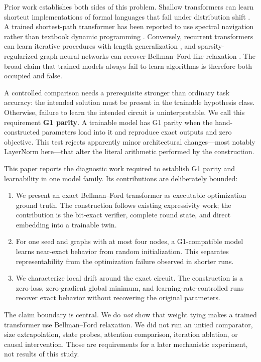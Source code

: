 \documentclass[10pt,twocolumn]{article}
\newcommand{\gparity}{\textsc{G1}}
\begin{document}
Prior work establishes both sides of this problem. Shallow transformers can
learn shortcut implementations of formal languages that fail under
distribution shift \citep{liu2022shortcuts}. A trained shortest-path
transformer has been reported to use spectral navigation rather than textbook
dynamic programming \citep{cohen2025spectral}. Conversely, recurrent
transformers can learn iterative procedures with length generalization
\citep{fan2024looped}, and sparsity-regularized graph neural networks can
recover Bellman--Ford-like relaxation \citep{nerem2026gnn}. The broad claim
that trained models always fail to learn algorithms is therefore both
occupied and false.

A controlled comparison needs a prerequisite stronger than ordinary task
accuracy: the intended solution must be present in the trainable hypothesis
class. Otherwise, failure to learn the intended circuit is uninterpretable.
We call this requirement \textbf{\gparity{} parity}. A trainable model has
\gparity{} parity when the hand-constructed parameters load into it and
reproduce exact outputs and zero objective. This test rejects apparently minor
architectural changes---most notably LayerNorm here---that alter the literal
arithmetic performed by the construction.

This paper reports the diagnostic work required to establish \gparity{} parity
and learnability in one model family. Its contributions are deliberately
bounded:

\begin{enumerate}
  \item We present an exact Bellman--Ford transformer as executable
  optimization ground truth. The construction follows existing expressivity
  work; the contribution is the bit-exact verifier, complete round state, and
  direct embedding into a trainable twin.
  \item For one seed and graphs with at most four nodes, a \gparity-compatible
  model learns near-exact behavior from random initialization. This separates
  representability from the optimization failure observed in shorter runs.
  \item We characterize local drift around the exact circuit. The construction
  is a zero-loss, zero-gradient global minimum, and learning-rate-controlled
  runs recover exact behavior without recovering the original parameters.
\end{enumerate}

The claim boundary is central. We do \emph{not} show that weight tying makes a
trained transformer use Bellman--Ford relaxation. We did not run an untied
comparator, size extrapolation, state probes, attention comparison, iteration
ablation, or causal intervention. Those are requirements for a later
mechanistic experiment, not results of this study.
\end{document}
